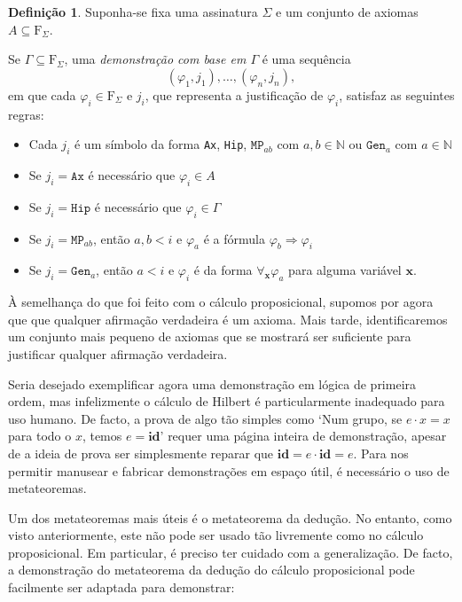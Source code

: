 \documentclass{report}
\theoremstyle{definition}
\newtheorem{definicao}{Definição}
\theoremstyle{remark}
\newcommand{\N}{\mathbb{N}}
\renewcommand{\bf}[1]{\mathbf{#1}}
\newcommand{\F}{\mathrm{F}}
\newcommand{\imply}{\mathbin{\Rightarrow}}
\begin{document}
	\begin{definicao}
	Suponha-se fixa uma assinatura $\Sigma$ e um conjunto de axiomas $A \subseteq \F_\Sigma$.
	
	Se $\Gamma \subseteq \F_\Sigma$, uma \emph{demonstração com base em $\Gamma$} é uma sequência
	\[(\varphi_1, j_1), \dots, (\varphi_n, j_n),\]
	em que cada $\varphi_i \in \F_\Sigma$ e $j_i$, que representa a justificação de $\varphi_i$, satisfaz as seguintes regras:
	
	\begin{itemize}
	\item Cada $j_i$ é um símbolo da forma \texttt{Ax}, \texttt{Hip}, $\texttt{MP}_{ab}$ com $a, b \in \N$ ou $\texttt{Gen}_a$ com $a \in \N$
	
	\item Se $j_i = \texttt{Ax}$ é necessário que $\varphi_i \in A$
	
	\item Se $j_i = \texttt{Hip}$ é necessário que $\varphi_i \in \Gamma$
	
	\item Se $j_i = \texttt{MP}_{ab}$, então $a, b < i$ e $\varphi_a$ é a fórmula $\varphi_b \imply \varphi_i$
	
	\item Se $j_i = \texttt{Gen}_a$, então $a < i$ e $\varphi_i$ é da forma $\forall_{\bf x} \varphi_a$ para alguma variável $\bf x$.
	\end{itemize}
	\end{definicao}
	
	À semelhança do que foi feito com o cálculo proposicional, supomos por agora que que qualquer afirmação verdadeira é um axioma. Mais tarde, identificaremos um conjunto mais pequeno de axiomas que se mostrará ser suficiente para justificar qualquer afirmação verdadeira.
	
	Seria desejado exemplificar agora uma demonstração em lógica de primeira ordem, mas infelizmente o cálculo de Hilbert é particularmente inadequado para uso humano. De facto, a prova de algo tão simples como `Num grupo, se $e \cdot x = x$ para todo o $x$, temos $e = \textbf{id}$' requer uma página inteira de demonstração, apesar de a ideia de prova ser simplesmente reparar que $\textbf{id} = e \cdot \textbf{id} = e$. Para nos permitir manusear e fabricar demonstrações em espaço útil, é necessário o uso de metateoremas.
	
	Um dos metateoremas mais úteis é o metateorema da dedução. No entanto, como visto anteriormente, este não pode ser usado tão livremente como no cálculo proposicional. Em particular, é preciso ter cuidado com a generalização. De facto, a demonstração do metateorema da dedução do cálculo proposicional pode facilmente ser adaptada para demonstrar:
	
\end{document}
